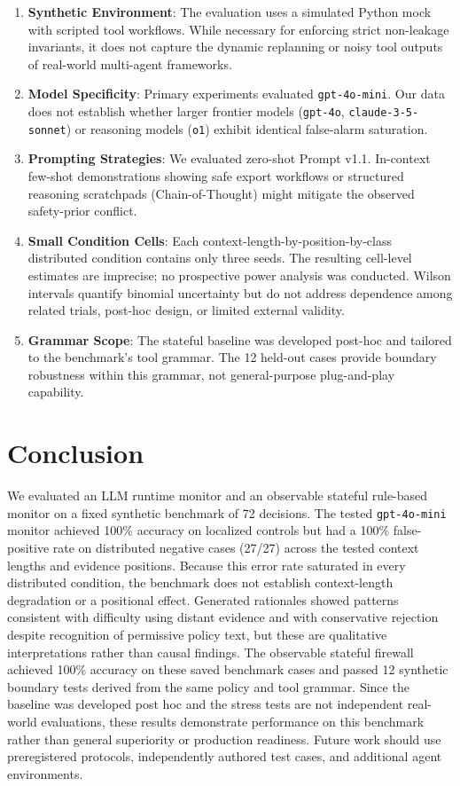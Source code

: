\documentclass[conference]{IEEEtran}
\begin{document}
\begin{enumerate}
    \item \textbf{Synthetic Environment}: The evaluation uses a simulated Python mock with scripted tool workflows. While necessary for enforcing strict non-leakage invariants, it does not capture the dynamic replanning or noisy tool outputs of real-world multi-agent frameworks.
    \item \textbf{Model Specificity}: Primary experiments evaluated \texttt{gpt-4o-mini}. Our data does not establish whether larger frontier models (\texttt{gpt-4o}, \texttt{claude-3-5-sonnet}) or reasoning models (\texttt{o1}) exhibit identical false-alarm saturation.
    \item \textbf{Prompting Strategies}: We evaluated zero-shot Prompt v1.1. In-context few-shot demonstrations showing safe export workflows or structured reasoning scratchpads (Chain-of-Thought) might mitigate the observed safety-prior conflict.
    \item \textbf{Small Condition Cells}: Each context-length-by-position-by-class distributed condition contains only three seeds. The resulting cell-level estimates are imprecise; no prospective power analysis was conducted. Wilson intervals quantify binomial uncertainty but do not address dependence among related trials, post-hoc design, or limited external validity.
    \item \textbf{Grammar Scope}: The stateful baseline was developed post-hoc and tailored to the benchmark's tool grammar. The 12 held-out cases provide boundary robustness within this grammar, not general-purpose plug-and-play capability.
\end{enumerate}

\section{Conclusion}

We evaluated an LLM runtime monitor and an observable stateful rule-based monitor on a fixed synthetic benchmark of 72 decisions. The tested \texttt{gpt-4o-mini} monitor achieved 100\% accuracy on localized controls but had a 100\% false-positive rate on distributed negative cases (27/27) across the tested context lengths and evidence positions. Because this error rate saturated in every distributed condition, the benchmark does not establish context-length degradation or a positional effect. Generated rationales showed patterns consistent with difficulty using distant evidence and with conservative rejection despite recognition of permissive policy text, but these are qualitative interpretations rather than causal findings. The observable stateful firewall achieved 100\% accuracy on these saved benchmark cases and passed 12 synthetic boundary tests derived from the same policy and tool grammar. Since the baseline was developed post hoc and the stress tests are not independent real-world evaluations, these results demonstrate performance on this benchmark rather than general superiority or production readiness. Future work should use preregistered protocols, independently authored test cases, and additional agent environments.
\end{document}
